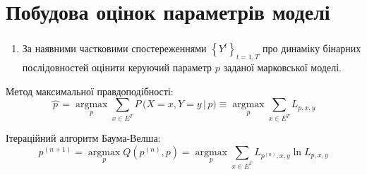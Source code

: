 \documentclass[12pt,mathserif]{beamer}
\DeclareMathOperator*{\argmax}{argmax}
\theoremstyle{plain}
\newtheorem{claim}{\indent Твердження}
\begin{document}

\section{Побудова оцінок параметрів моделі}

\begin{frame}[t]
    \frametitle{\insertsection}
    \begin{enumerate}[1]
        \item За наявними частковими спостереженнями $\left\{ Y^t \right\}_{t=\overline{1,T}}$ про динаміку бінарних послідовностей оцінити керуючий параметр $p$ заданої марковської моделі.
    \end{enumerate}
    \vspace{0.5cm}

    Метод максимальної правдоподібності:
    \begin{equation*}
        \widehat{\,p\,} = \argmax\limits_{p} \sum_{x \in E^T} P\, \bigl( X=x,Y=y \,|\, p \bigr) \equiv \argmax\limits_{p} \sum_{x \in E^T} L_{p,x,y}
    \end{equation*}

    Ітераційний алгоритм Баума-Велша:
    \begin{equation*}
        p^{(n+1)} = \argmax\limits_{p} Q\left( p^{(n)},p \right) = \argmax\limits_{p} \sum_{x \in E^T}L_{p^{(n)},x,y} \ln L_{p,x,y}
    \end{equation*}
\end{frame}
\end{document}

